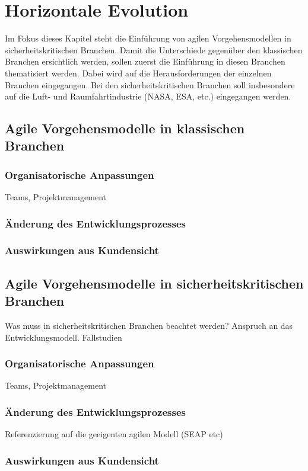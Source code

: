 \chapter{Horizontale Evolution} %

Im Fokus dieses Kapitel steht die Einführung von agilen Vorgehensmodellen in sicherheitskritischen Branchen.
Damit die Unterschiede gegenüber den klassischen Branchen ersichtlich werden, sollen zuerst die Einführung in diesen Branchen thematisiert werden.
Dabei wird auf die Herausforderungen der einzelnen Branchen eingegangen.
Bei den sicherheitskritischen Branchen soll insbesondere auf die Luft- und Raumfahrtindustrie (NASA, ESA, etc.) eingegangen werden.

\section{Agile Vorgehensmodelle in klassischen Branchen} %

\subsection{Organisatorische Anpassungen}

Teams, Projektmanagement

\subsection{Änderung des Entwicklungsprozesses}

\subsection{Auswirkungen aus Kundensicht}



\section{Agile Vorgehensmodelle in sicherheitskritischen Branchen} %

Was muss in sicherheitskritischen Branchen beachtet werden?
Anspruch an das Entwicklungsmodell.
Fallstudien

\subsection{Organisatorische Anpassungen}

Teams, Projektmanagement

\subsection{Änderung des Entwicklungsprozesses}

Referenzierung auf die geeigenten agilen Modell (SEAP etc)

\subsection{Auswirkungen aus Kundensicht}




